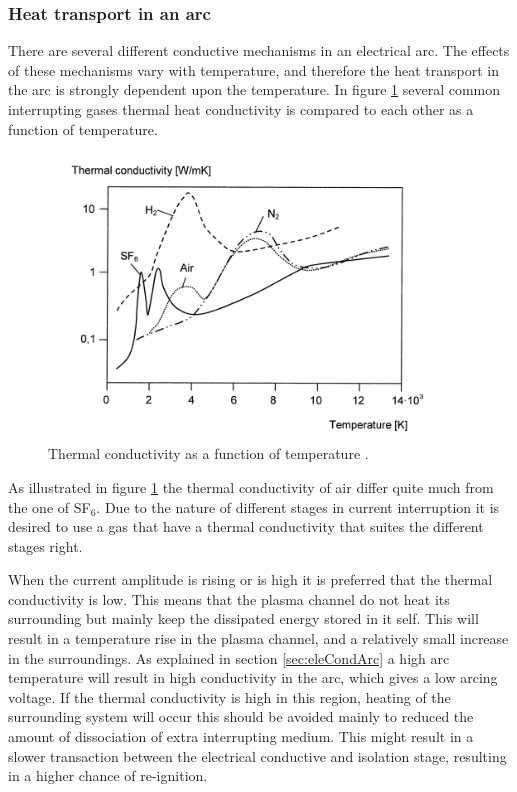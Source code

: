 \documentclass[10pt,a4paper]{article} %
\begin{document}
\subsubsection{Heat transport in an arc} \label{sec:HeatTransport}
There are several different conductive mechanisms in an electrical arc. The effects of these mechanisms vary with temperature, and therefore the heat transport in the arc is strongly dependent upon the temperature. In figure \ref{fig:tempConGas} several common interrupting gases thermal heat conductivity is compared to each other as a function of temperature.

\begin{figure}[H]
\centering
\includegraphics[scale=0.8]{Bilder/Theory/thermalCond.png}
\caption{Thermal conductivity as a function of temperature \cite{bib:HVEbreak}.} \label{fig:tempConGas}
\end{figure}

As illustrated in figure \ref{fig:tempConGas} the thermal conductivity of air differ quite much from the one of SF$_6$. Due to the nature of different stages in current interruption it is desired to use a gas that have a thermal conductivity that suites the different stages right. 

When the current amplitude is rising or is high it is preferred that the thermal conductivity is low. This means that the plasma channel do not heat its surrounding but mainly keep the dissipated energy stored in it self. This will result in a temperature rise in the plasma channel, and a relatively small increase in the surroundings. As explained in section \ref{sec:eleCondArc} a high arc temperature will result in high conductivity in the arc, which gives a low arcing voltage. If the thermal conductivity is high in this region, heating of the surrounding system will occur this should be avoided mainly to reduced the amount of dissociation of extra interrupting medium. This might result in a slower transaction between the electrical conductive and isolation stage, resulting in a higher chance of re-ignition.
\end{document}
